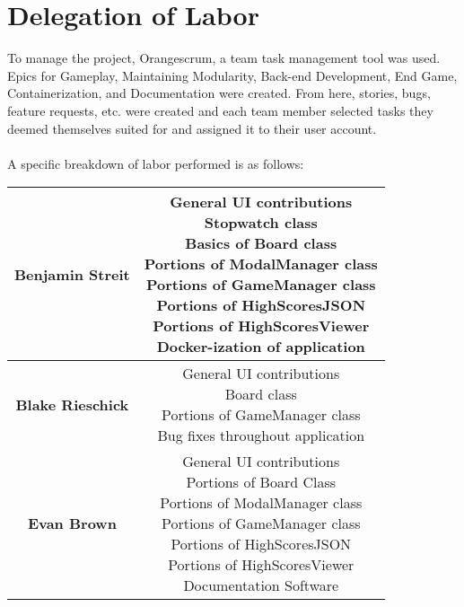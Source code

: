 \documentclass[12pt]{report}
\begin{document}
\section*{Delegation of Labor}
To manage the project, Orangescrum, a team task management tool was used. Epics for Gameplay, Maintaining Modularity, Back-end Development, End Game, Containerization, and Documentation were created. From here, stories, bugs, feature requests, etc. were created and each team member selected tasks they deemed themselves suited for and assigned it to their user account.
\\ \\
A specific breakdown of labor performed is as follows:
\begin{center}
\begin{tabular}{ cc } 
 \textbf{Benjamin Streit} & \makecell{General UI contributions \\ Stopwatch class \\
 Basics of Board class \\ Portions of ModalManager class \\ Portions of GameManager class \\ Portions of HighScoresJSON \\
 Portions of HighScoresViewer
 \\ Docker-ization of application} \\ \hline
 \textbf{Blake Rieschick} &  \makecell{General UI contributions \\ Board class \\ Portions of GameManager class \\ 
 Bug fixes throughout application} \\ 
 \hline
 \textbf{Evan Brown} &  \makecell{General UI contributions \\ Portions of Board Class \\ Portions of ModalManager class \\ Portions of GameManager class \\ Portions of HighScoresJSON \\
 Portions of HighScoresViewer \\ Documentation Software}
\end{tabular}
\end{center}

%
%
\end{document}
